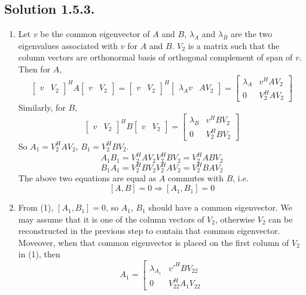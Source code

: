 \documentclass{article}
\begin{document}
\subsection*{Solution 1.5.3.}
\begin{enumerate}
    \item Let $v$ be the common eigenvector of $A$ and $B$, $\lambda_A$ and $\lambda_B$ are the two eigenvalues associated with $v$ for $A$ and $B$.  $V_2$ is a matrix such that the column vectors are orthonormal basis of orthogonal complement of span of $v$. Then for $A$,
    \[\left[\begin{array}{cc}v&V_2
    \end{array}\right]^H A\left[\begin{array}{cc}v&V_2
    \end{array}\right]=\left[\begin{array}{cc}v&V_2
    \end{array}\right]^H\left[\begin{array}{cc}\lambda_Av &A V_2
    \end{array}\right]=\left[\begin{array}{cc}\lambda_A&v^HAV_2\\0&V_2^HAV_2
    \end{array}\right]\]
    Similarly, for $B$, 
    \[\left[\begin{array}{cc}v&V_2
    \end{array}\right]^H B\left[\begin{array}{cc}v&V_2
    \end{array}\right]=\left[\begin{array}{cc}\lambda_B&v^HBV_2\\0&V_2^HBV_2
    \end{array}\right]\]
    So $A_1=V_2^HAV_2$, $B_1=V_2^HBV_2$.\\
    \[A_1B_1=V_2^HAV_2V_2^HBV_2=V_2^HABV_2\]
    \[B_1A_1=V_2^HBV_2V_2^HAV_2=V_2^HBAV_2\]
    The above two equations are equal as $A$ commutes with $B$, i.e.
    \[[A,B]=0 \Rightarrow [A_1,B_1]=0\]
    \item From (1), $[A_1,B_1]=0$, so $A_1$, $B_1$ should have a common eigenvector. We may assume that it is one of the column vectors of $V_2$, otherwise $V_2$ can be reconstructed in the previous step to contain that common eigenvector. \\
    Moveover, when that common eigenvector is placed on the first column of $V_2$ in (1), then 
    \[A_1=\left[\begin{array}{cc}\lambda_{A_1}&v'^HBV_{22}\\0&V_{22}^HA_1V_{22}

\end{array}\]
\end{enumerate}
\end{document}

